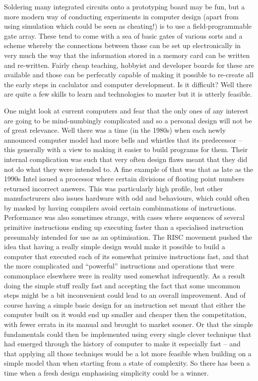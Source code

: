 Soldering many integrated circuits onto a prototyping board may be fun, but
a more modern way of conducting experiments in computer design (apart from
using simulation which could be seen as cheating!) is to use a
field-programmable gate array. These tend to come with a sea of basic
gates of various sorts and a scheme whereby the connections between those
can be set up electronically in very much the way that the information stored
in a memory card can be written and re-written. Fairly cheap teaching,
hobbyist and developer boards for these are available and those can be
perfecatly capable of making it possible to re-create all the early
steps in caclulator and computer development. Is it difficult? Well there
are quite a few skills to learn and technologies to master but it is
utterly feasible.

One might look at current computers and fear that the only ones of any
interest are going to be mind-numbingly complicated and so a personal
design will not be of great relevance. Well there was a time (in the 1980s)
when each newly announced computer model had more bells and whistles that
its predecessor -- this generally with a view to making it easier to build
programs for them. Their internal complication was such that very often
design flaws meant that they did not do what they were intended to. A
fine example of that was that as late as the 1990s Intel issued a processor
where certain divisions of floating point numbers returned incorrect
answers\cite{fdiv_bug}. This was particularly high profile, but other
manufactrurers also issues hardware with odd and behaviours, which could
often by masked by having compilers avoid certain combinmations of
instructions. Performance was also sometimes strange, with cases where
sequences of several primitive instructions ending up executing faster than
a specialised instruction presumably intended for use as an optimisation.
The RISC\cite{risc} movement pushed the idea that having a really simple
design would make it possible to build a computer that executed each of its
somewhat primive instructions fast, and that the more complicated and
``powerful'' instructions and operations that were commonplace elsewhere
were in reality used somewhat infrequently. As a result doing the simple
stuff really fast and accepting the fact that some uncommon steps might
be a bit inconvenient could lead to an overall improvement. And of
course having a simple basic design for an instruction set meant that
either the computer built on it would end up smaller and cheaper then
the competitation, with fewer errata in its manual and brought to market
sooner. Or that the simple fundamentals could then be implemented using every
single clever technique that had emerged through the history of computer
to make it especially fast -- and that applying all those techniqes would be
a lot more feasible when building on a simple model than when starting
from a state of complexity. So there has been a time when a fresh design
emphasising simplicity could be a winner.

